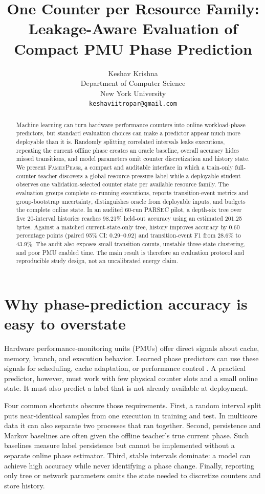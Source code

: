 \documentclass{article}
\title{One Counter per Resource Family: Leakage-Aware Evaluation of Compact PMU Phase Prediction}
\author{%
  Keshav Krishna \\
  Department of Computer Science \\
  New York University \\
  \texttt{keshaviitropar@gmail.com}
}
\newcommand{\system}{\textsc{FamilyPhase}}
\begin{document}
\maketitle

\begin{abstract}
Machine learning can turn hardware performance counters into online workload-phase
predictors, but standard evaluation choices can make a predictor appear much more
deployable than it is. Randomly splitting correlated intervals leaks executions,
repeating the current offline phase creates an oracle baseline, overall accuracy hides
missed transitions, and model parameters omit counter discretization and history
state. We present \system, a compact and auditable interface in which a train-only
full-counter teacher discovers a global resource-pressure label while a deployable
student observes one validation-selected counter state per available resource family.
The evaluation groups complete co-running executions, reports transition-event
metrics and group-bootstrap uncertainty, distinguishes oracle from deployable inputs,
and budgets the complete online state. In an audited 60-run PARSEC pilot, a depth-six
tree over five 20-interval histories reaches 98.21\% held-out accuracy using an
estimated 201.25 bytes. Against a matched current-state-only tree, history improves
accuracy by 0.60 percentage points (paired 95\% CI: 0.29--0.92) and transition-event
F1 from 28.6\% to 43.9\%. The audit also exposes small transition counts, unstable
three-state clustering, and poor PMU enabled time. The main result is therefore an
evaluation protocol and reproducible study design, not an uncalibrated energy claim.
\end{abstract}

\section{Why phase-prediction accuracy is easy to overstate}

Hardware performance-monitoring units (PMUs) offer direct signals about cache,
memory, branch, and execution behavior. Learned phase predictors can use these signals
for scheduling, cache adaptation, or performance control
\citep{sherwood2003phase,perelman2006parallel,kim2017p4,lozano2022phase}. A practical
predictor, however, must work with few physical counter slots and a small online state.
It must also predict a label that is not already available at deployment.

Four common shortcuts obscure those requirements. First, a random interval split puts
near-identical samples from one execution in training and test. In multicore data it
can also separate two processes that ran together. Second, persistence and Markov
baselines are often given the offline teacher's true current phase. Such baselines
measure label persistence but cannot be implemented without a separate online phase
estimator. Third, stable intervals dominate: a model can achieve high accuracy while
never identifying a phase change. Finally, reporting only tree or network parameters
omits the state needed to discretize counters and store history.
\end{document}
